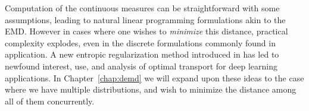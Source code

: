 Computation of the continuous measures can be straightforward with some assumptions,
leading to natural linear programming formulations akin to the EMD.
However in cases where one wishes to \textit{minimize} this distance,
practical complexity explodes, even in the discrete
formulations commonly found in application.
A new entropic regularization method introduced in \cite{lightspeed}
has led to newfound interest,
use, and analysis of optimal transport for deep learning applications.
In Chapter~\ref{chap:demd} we will expand upon these
ideas to the case where we have multiple distributions,
and wish to minimize the distance among all of them concurrently.
